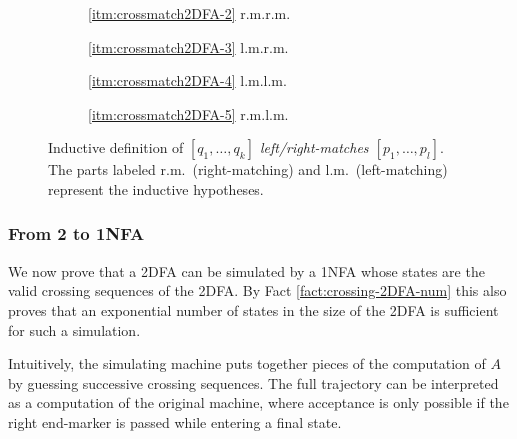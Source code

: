 \begin{figure}
	\centering
	\begin{subfigure}{0.246\textwidth}
		\centering
		
		\caption*{\ref{itm:crossmatch2DFA-2} r.m.\tto r.m.}
	\end{subfigure}
	\hfill
	\begin{subfigure}{0.242\textwidth}
		\centering
		
		\caption*{\ref{itm:crossmatch2DFA-3} l.m.\tto r.m.}
	\end{subfigure}
	\hfill
	\begin{subfigure}{0.242\textwidth}
		\centering
		
		\caption*{\ref{itm:crossmatch2DFA-4} l.m.\tto l.m.}
	\end{subfigure}
	\hfill
	\begin{subfigure}{0.246\textwidth}
		\centering
		
		\caption*{\ref{itm:crossmatch2DFA-5} r.m.\tto l.m.}
	\end{subfigure}
	\caption{Inductive definition of \emph{$[q_1,\dots,q_k]$ left/right-matches $[p_1,\dots,p_l]$}. The parts labeled r.m.\ (right-matching) and l.m.\ (left-matching) represent the inductive hypotheses.}
	\label{fig:2DFA-crossmatch}
\end{figure}

\subsubsection{From 2\DFAs{} to 1NFA}
We now prove that a 2DFA can be simulated by a 1NFA whose states are the valid crossing sequences of the 2DFA.
By Fact \ref{fact:crossing-2DFA-num} this also proves that an exponential number of states in the size of the 2DFA is sufficient for such a simulation.

Intuitively, the simulating machine puts together pieces of the computation of $A$ by guessing successive crossing sequences.
The full trajectory can be interpreted as a computation of the original machine, where acceptance is only possible if the right end-marker is passed while entering a final state.

